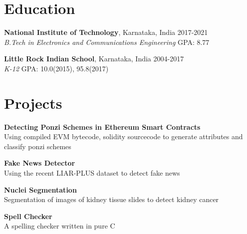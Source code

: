 \documentclass[margin]{res}
\begin{document}


  \address{National Institute of Technology\\Karnataka, India\\nitk.ac.in}
  \address{(91+) 9611212081\\russel.171ec143@nitk.edu.in\\github.com/rshwndsz}


  \begin{resume}
    \section{Education}
      \textbf{National Institute of Technology}, Karnataka, India\hfill 
      2017-2021
      \\
      {\sl B.Tech in Electronics and Communications Engineering}\hfill 
      GPA: 8.77
      

      \textbf{Little Rock Indian School}, Karnataka, India\hfill
      2004-2017
      \\
      {\sl K-12}\hfill
      GPA: 10.0(2015), 95.8(2017)

    \section{Projects}
      \par
      \textbf{Detecting Ponzi Schemes in Ethereum Smart Contracts}\\
      Using compiled EVM bytecode, solidity sourcecode to generate attributes 
      and classify ponzi schemes 

      \par
      \textbf{Fake News Detector}\\
      Using the recent LIAR-PLUS dataset to detect fake news

      \par
      \textbf{Nuclei Segmentation}\\
      Segmentation of images of kidney tissue slides to detect kidney cancer

      \par
      \textbf{Spell Checker}\\
      A spelling checker written in pure C


\end{resume}
\end{document}
